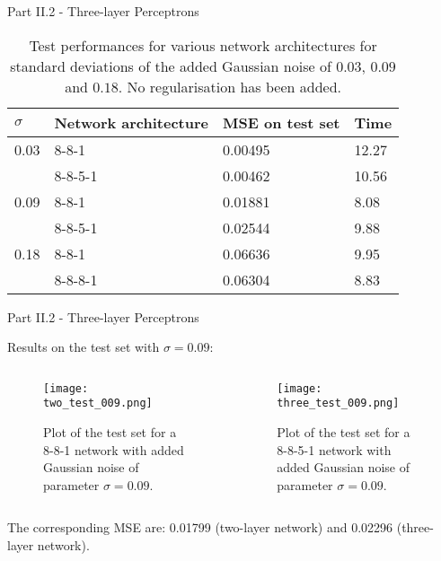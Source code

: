 \documentclass{beamer}
\begin{document}
\begin{frame}{Part II.2 - Three-layer Perceptrons}
    
    \begin{table}[H]
    \footnotesize
    \begin{center}
    \bgroup
    \def\arraystretch{1.5}
    \begin{tabular}{|l|l|l|l|} \hline
    $\sigma$ & Network architecture & MSE on test set & Time \\ \hline
    0.03 & 8-8-1 & 0.00495 & 12.27 \\ \hline 
    & 8-8-5-1 & 0.00462 & 10.56 \\ \hline
    0.09 & 8-8-1 & 0.01881 & 8.08 \\ \hline
    & 8-8-5-1 & 0.02544 & 9.88 \\ \hline
    0.18 & 8-8-1 & 0.06636 & 9.95 \\ \hline
    & 8-8-8-1 & 0.06304 & 8.83 \\ \hline
    \end{tabular}
    \end{center}
    \caption{Test performances for various network architectures for standard deviations of the added Gaussian noise of $0.03$, $0.09$ and $0.18$. No regularisation has been added.}
    \end{table}
    
\end{frame}


\begin{frame}{Part II.2 - Three-layer Perceptrons}
    
    Results on the test set with $\sigma=0.09$:
    
  \begin{columns}[T]
    \begin{column}{.5\textwidth}
    \begin{block}{}
    \begin{figure} [H]
    \centering
    \texttt{[image: two\_test\_009.png]}
    \caption{Plot of the test set for a 8-8-1 network with added Gaussian noise of parameter $\sigma=0.09$.}
    \end{figure}
    \end{block}
    \end{column}
    \begin{column}{.5\textwidth}
    \begin{block}{}
    \begin{figure} [H]
    \centering
    \texttt{[image: three\_test\_009.png]}
    \caption{Plot of the test set for a 8-8-5-1 network with added Gaussian noise of parameter $\sigma=0.09$.}
    \end{figure}
    \end{block}
    \end{column}
  \end{columns}
  
  The corresponding MSE are: 0.01799 (two-layer network) and 0.02296 (three-layer network).
    
\end{frame}
\end{document}
